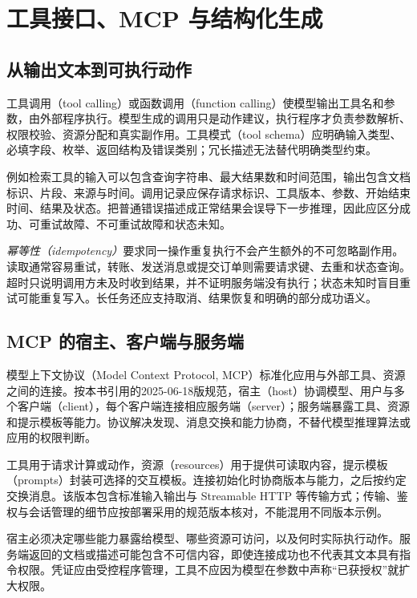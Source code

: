 \setcounter{chapter}{15} %
\chapter{工具接口、MCP 与结构化生成}
\label{ch:tools}

\section{从输出文本到可执行动作}

工具调用（tool calling）或函数调用（function calling）使模型输出工具名和参数，由外部程序执行。模型生成的调用只是动作建议，执行程序才负责参数解析、权限校验、资源分配和真实副作用。工具模式（tool schema）应明确输入类型、必填字段、枚举、返回结构及错误类别；冗长描述无法替代明确类型约束。

例如检索工具的输入可以包含查询字符串、最大结果数和时间范围，输出包含文档标识、片段、来源与时间。调用记录应保存请求标识、工具版本、参数、开始结束时间、结果及状态。把普通错误描述成正常结果会误导下一步推理，因此应区分成功、可重试故障、不可重试故障和状态未知。

\emph{幂等性（idempotency）}要求同一操作重复执行不会产生额外的不可忽略副作用。读取通常容易重试，转账、发送消息或提交订单则需要请求键、去重和状态查询。超时只说明调用方未及时收到结果，并不证明服务端没有执行；状态未知时盲目重试可能重复写入。长任务还应支持取消、结果恢复和明确的部分成功语义。

\section{MCP 的宿主、客户端与服务端}

模型上下文协议（Model Context Protocol, MCP）标准化应用与外部工具、资源之间的连接。按本书引用的2025-06-18版规范，宿主（host）协调模型、用户与多个客户端（client），每个客户端连接相应服务端（server）；服务端暴露工具、资源和提示模板等能力\cite{mcp}。协议解决发现、消息交换和能力协商，不替代模型推理算法或应用的权限判断。

工具用于请求计算或动作，资源（resources）用于提供可读取内容，提示模板（prompts）封装可选择的交互模板。连接初始化时协商版本与能力，之后按约定交换消息。该版本包含标准输入输出与 Streamable HTTP 等传输方式；传输、鉴权与会话管理的细节应按部署采用的规范版本核对，不能混用不同版本示例。

宿主必须决定哪些能力暴露给模型、哪些资源可访问，以及何时实际执行动作。服务端返回的文档或描述可能包含不可信内容，即使连接成功也不代表其文本具有指令权限。凭证应由受控程序管理，工具不应因为模型在参数中声称“已获授权”就扩大权限。

